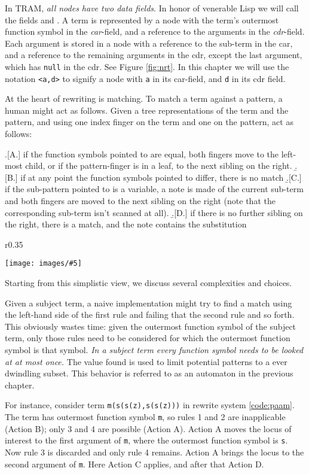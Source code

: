\documentclass[11pt,twoside]{memoir}
\newcommand{\D}[1]{\index{#1}\defn{#1}}
\def\E{\emph} %
\def\T{\texttt}
\newcommand{\img}[7]{
\begin{wrapfigure}{#1}{#2\textwidth}
  \vspace{-20pt}
  \begin{center}
    \texttt{[image: images/\#5]}
	\caption{#7}
	\label{#6}
  \end{center}
  \vspace{#4pt}
\end{wrapfigure}
\vspace{7pt}
}
\begin{document}
In TRAM, \E{all nodes have two data fields}. In honor of venerable Lisp we will call the fields \D{car} and \D{cdr}. A term is represented by a node with the term's outermost function symbol in the \E{car}-field, and a reference to the arguments in the \E{cdr}-field. Each argument is stored in a node with a reference to the sub-term in the car, and a reference to the remaining arguments in the cdr, except the last argument, which has \T{null} in the cdr. See Figure \ref{fig:nrt}. In this chapter we will use the notation \T{<a,d>} to signify a node with \T{a} in its car-field, and \T{d} in its cdr field.

At the heart of rewriting is matching. To match a term against a pattern, a human might act as follows. Given a tree representations of the term and the pattern, and using one index finger on the term and one on the pattern, act as follows: 

\a.[A.] if the function symbols pointed to are equal, both fingers move to the left-most child, or if the pattern-finger is in a leaf, to the next sibling on the right.
\b.[B.] if at any point the function symbols pointed to differ, there is no match
\b.[C.] if the sub-pattern pointed to is a variable, a note is made of the current sub-term and both fingers are moved to the next sibling on the right (note that the corresponding sub-term isn't scanned at all).
\b.[D.] if there is no further sibling on the right, there is a match, and the note contains the substitution

\img{r}{0.35}{0.35}{-10}{fig-mtap.png}{fig-mtap}{Matching Term and Pattern}

Starting from this simplistic view, we discuss several complexities and choices. 

\renewcommand{\theenumi}{\Alph{enumi}}

Given a subject term, a naive implementation might try to find a match using the left-hand side of the first rule and failing that the second rule and so forth. This obviously wastes time: given the outermost function symbol of the subject term, only those rules need to be considered for which the outermost function symbol is that symbol. \E{In a subject term every function symbol needs to be looked at at most once.} The value found is used to limit potential patterns to a ever dwindling subset. This behavior is referred to as an automaton in the previous chapter.

For instance, consider term \T{m(s(s(z),s(s(z)))} in rewrite system \ref{code:paam}. The term has outermost function symbol \T{m}, so rules 1 and 2 are inapplicable (Action B); only 3 and 4 are possible (Action A). Action A moves the locus of interest to the first argument of \T{m}, where the outermost function symbol is \T{s}. Now rule 3 is discarded and only rule 4 remains. Action A brings the locus to the second argument of \T{m}. Here Action C applies, and after that Action D.
\end{document}
